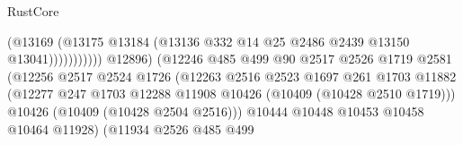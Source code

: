 \begin{lexlean}{RustCore}
\begin{coremodule}
                                                      (@13169
                                                        (@13175
                                                          @13184
                                                          (@13136
                                                            @332
                                                            @14
                                                            @25
                                                            @2486
                                                            @2439
                                                            @13150
                                                            @13041)))))))))))
                                      @12896)
                                    (@12246
                                      @485
                                      @499
                                      @90
                                      @2517
                                      @2526
                                      @1719
                                      @2581
                                      (@12256
                                        @2517
                                        @2524
                                        @1726
                                        (@12263
                                          @2516
                                          @2523
                                          @1697
                                          @261
                                          @1703
                                          @11882
                                          (@12277
                                            @247
                                            @1703
                                            @12288
                                            @11908
                                            @10426
                                            (@10409 (@10428 @2510 @1719)))
                                          @10426
                                          (@10409 (@10428 @2504 @2516)))
                                        @10444
                                        @10448
                                        @10453
                                        @10458
                                        @10464
                                        @11928)
                                      (@11934
                                        @2526
                                        @485
                                        @499

\end{coremodule}
\end{lexlean}
